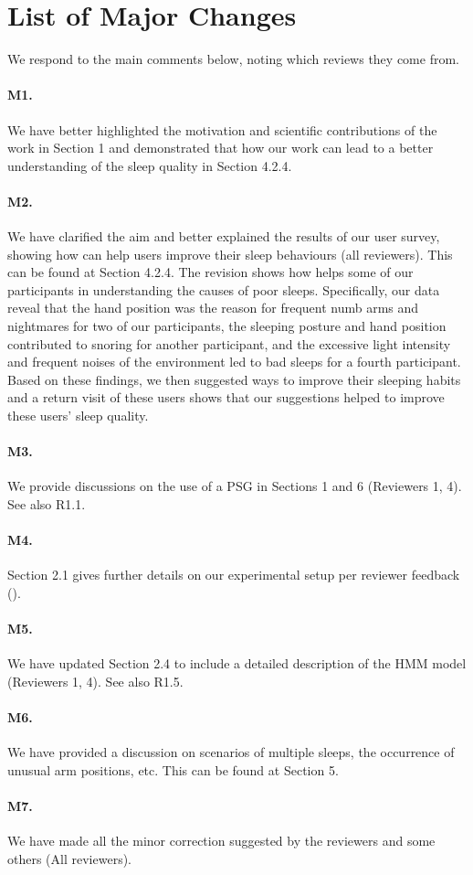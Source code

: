 \section*{List of Major Changes}

We respond to the main comments below, noting which reviews they come from.

\paragraph{M1.} We have better highlighted the motivation and scientific contributions of the work in Section 1 and demonstrated that how our work can lead to
a better understanding of the sleep quality in Section 4.2.4.

\paragraph{M2.} We have clarified the aim and better explained the results of our user survey, showing how \systemname can help users
improve their sleep behaviours (all reviewers). This can be found at Section 4.2.4. The revision shows how \systemname helps some of our
participants in understanding the causes of poor sleeps. Specifically, our data reveal that the hand position was the reason for frequent
numb arms and nightmares for two of our participants, the sleeping posture and hand position contributed to snoring for another
participant, and the excessive light intensity and frequent noises of the environment led to bad sleeps for a fourth participant. Based on
these findings, we then suggested ways to improve their sleeping habits and a return visit
of these users shows that our suggestions helped to improve these users' sleep quality.

\paragraph{M3.} We provide discussions on the use of a PSG in Sections 1 and 6 (Reviewers 1, 4). See also R1.1.

\paragraph{M4.} Section 2.1 gives further details on our experimental setup per reviewer feedback (). 

\paragraph{M5.} We have updated Section 2.4 to include a detailed description of the HMM model (Reviewers 1, 4). See also R1.5.



\paragraph{M6.} We have provided a discussion on scenarios of multiple sleeps, the occurrence of unusual arm positions, etc. This can be
found at Section 5.

\paragraph{M7.} We have made all the minor correction suggested by the reviewers and some others (All reviewers).
